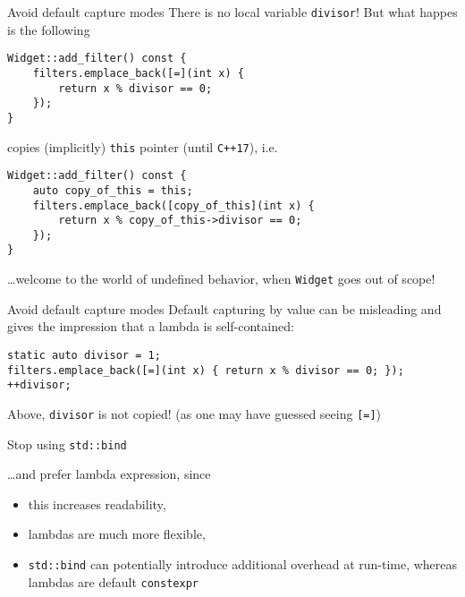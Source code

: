 \begin{frame}[fragile]{Avoid default capture modes}
    There is no local variable \texttt{divisor}! But what happes is the following
    \begin{lstlisting}
Widget::add_filter() const {
    filters.emplace_back([=](int x) {
        return x % divisor == 0;
    });
}
    \end{lstlisting}
    copies (implicitly) \texttt{this} pointer (\textcolor{vertexDarkRed}{until \texttt{C++17}}), i.e.
    \begin{lstlisting}    
Widget::add_filter() const {
    auto copy_of_this = this;
    filters.emplace_back([copy_of_this](int x) {
        return x % copy_of_this->divisor == 0;
    });
}
    \end{lstlisting}

    \ldots welcome to the world of undefined behavior, when \texttt{Widget} goes out of scope!
\end{frame}

\begin{frame}[fragile]{Avoid default capture modes}
    Default capturing by value can be misleading and gives the impression that a lambda is self-contained:
    \begin{lstlisting}
static auto divisor = 1;
filters.emplace_back([=](int x) { return x % divisor == 0; });
++divisor;
    \end{lstlisting}
    Above, \texttt{divisor} is not copied! (as one may have guessed seeing \texttt{[=]})
\end{frame}

\begin{frame}[fragile]{Stop using \texttt{std::bind}}

    \ldots and prefer lambda expression, since
    \begin{itemize}
        \item this increases readability,
        \item lambdas are much more flexible,
        \item \texttt{std::bind} can potentially introduce additional overhead at run-time, whereas lambdas are default \texttt{constexpr}
    \end{itemize}
\end{frame}

